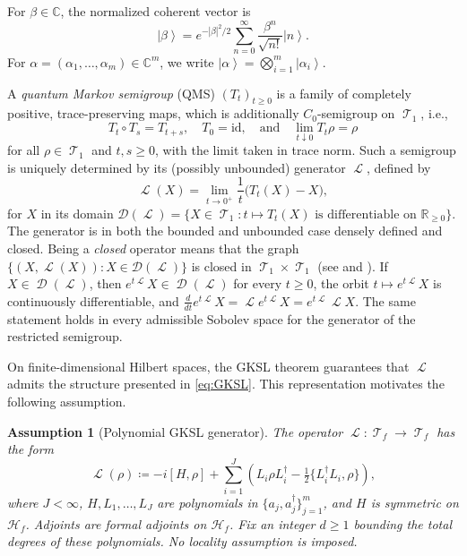 \documentclass[11pt]{article}
\theoremstyle{myplain}
\newtheorem{assum}{Assumption}
\theoremstyle{mydefinition}
\theoremstyle{remark}
\DeclareMathOperator{\cD}{\mathcal{D}}
\DeclareMathOperator{\cL}{\mathcal{L}}
\DeclareMathOperator{\cT}{\mathcal{T}}
\DeclareMathOperator{\1}{\mathds{1}}
\newcommand{\ket}[1]{\left\vert #1 \right\rangle}
\begin{document}
    For $\beta \in \mathbb{C}$, the normalized coherent vector is
    \begin{equation*}
        \ket{\beta} = e^{-|\beta|^2/2} \sum_{n=0}^{\infty} \frac{\beta^n}{\sqrt{n!}} \ket{n}.
    \end{equation*}
    For $\alpha = (\alpha_1, \ldots, \alpha_m) \in \mathbb{C}^m$, we write $\ket{\alpha} = \bigotimes_{i=1}^m \ket{\alpha_i}$.

    A \emph{quantum Markov semigroup} (QMS) $(T_t)_{t \ge 0}$ is a family of completely positive, trace-preserving maps, which is additionally $C_0$-semigroup on $\cT_1$, i.e.,
    \begin{equation}\label{eq:semigroup}
        T_t \circ T_s = T_{t+s}, \quad T_0 = \mathrm{id}, \quad \text{and} \quad \lim_{t \downarrow 0} T_t\rho = \rho
    \end{equation}
    for all $\rho \in \cT_1$ and $t,s \ge 0$, with the limit taken in trace norm. Such a semigroup is uniquely determined by its (possibly unbounded) generator $\cL$, defined by
    \begin{equation*}
        \cL(X) = \lim_{t \to 0^+} \frac{1}{t}\big(T_t(X) - X\big),
    \end{equation*}
    for $X$ in its domain $\mathcal{D}(\cL) = \{X \in \cT_1 : t \mapsto T_t(X) \text{ is differentiable on } \mathbb{R}_{\ge 0}\}$. The generator is in both the bounded and unbounded case densely defined and closed. Being a \emph{closed} operator means that the graph $\{(X, \cL(X)) : X \in \mathcal{D}(\cL)\}$ is closed in $\cT_1 \times \cT_1$ (see \cite[Ch.~III]{Kato.1995} and \cite[Thm.~II.1.4]{Engel.2000}).
    If $X\in\cD(\cL)$, then $e^{t\cL}X\in\cD(\cL)$ for every $t\geq0$, the orbit $t\mapsto e^{t\cL}X$ is continuously differentiable, and $\frac{d}{dt}e^{t\cL}X=\cL e^{t\cL}X=e^{t\cL}\cL X$. The same statement holds in every admissible Sobolev space for the generator of the restricted semigroup.

    On finite-dimensional Hilbert spaces, the GKSL theorem \cite{Gorini.1976, Lindblad.1976} guarantees that $\cL$ admits the structure presented in \eqref{eq:GKSL}. This representation motivates the following assumption.
    
    \begin{assum}[Polynomial GKSL generator]\label{assum:concentrated-polynomial}
        The operator $\cL : \cT_f \to \cT_f$ has the form
        \begin{equation}\label{eq:bosonic-GKLS}
            \cL(\rho) \coloneqq -i[H, \rho] + \sum_{i = 1}^{J} \left(L_i \rho L_i^\dagger - \tfrac{1}{2}\{L_i^\dagger L_i, \rho\}\right),
        \end{equation}
        where $J < \infty$, $H,L_1,\ldots,L_J$ are polynomials in
        $\{a_j, a_j^\dagger\}_{j=1}^m$, and $H$ is symmetric on
        $\mathcal H_f$. Adjoints are formal adjoints on $\mathcal H_f$.
        Fix an integer $d \geq 1$ bounding the total degrees of these
        polynomials. No locality assumption is imposed.
    \end{assum}
    
\end{document}
